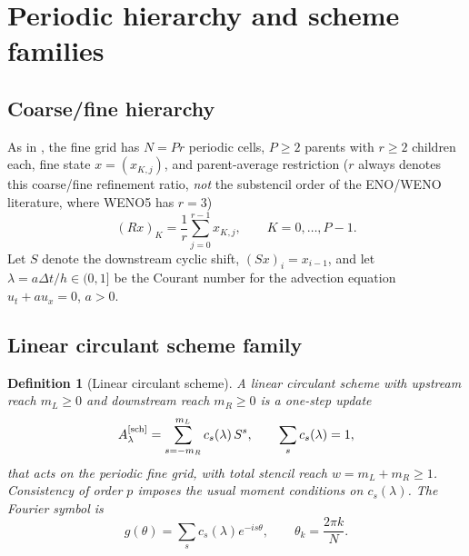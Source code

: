 \documentclass[pdflatex,sn-mathphys-num]{sn-jnl}%
\theoremstyle{thmstyleone}%
\theoremstyle{thmstyletwo}%
\theoremstyle{thmstylethree}%
\newtheorem{definition}{Definition}%
\newcommand{\Asch}{A^{[\rm sch]}_\lambda}
\begin{document}
\section{Periodic hierarchy and scheme families}\label{sec:setup}

\subsection{Coarse/fine hierarchy}\label{sec:hierarchy}

As in \cite{PolemitisChristakisDrikakis2026FVerasure}, the fine grid has $N=Pr$ periodic cells, $P\ge2$ parents with $r\ge2$ children each, fine state $x=(x_{K,j})$, and parent-average restriction ($r$ always denotes this coarse/fine refinement ratio, \emph{not} the substencil order of the ENO/WENO literature, where WENO5 has $r=3$) \[ (Rx)_K=\frac1r\sum_{j=0}^{r-1}x_{K,j}, \qquad K=0,\ldots,P-1 .\]
Let $S$ denote the downstream cyclic shift, $(Sx)_i=x_{i-1}$, and let $\lambda=a\Delta t/h\in(0,1]$ be the Courant number for the advection equation $u_t+au_x=0$, $a>0$.

\subsection{Linear circulant scheme family}\label{sec:linear-family}

\begin{definition}[Linear circulant scheme]\label{def:circulant-scheme}
A linear circulant scheme with upstream reach $m_L\ge0$ and downstream reach $m_R\ge0$ is a one-step update \[ \Asch = \sum_{s=-m_R}^{m_L} c_s(\lambda)\, S^{s}, \qquad \sum_s c_s(\lambda)=1 , \] that acts on the periodic fine grid, with total stencil reach $w=m_L+m_R\ge1$.
Consistency of order $p$ imposes the usual moment conditions on $c_s(\lambda)$.
The Fourier symbol is \[ g(\theta)=\sum_s c_s(\lambda)e^{-is\theta}, \qquad \theta_k=\frac{2\pi k}{N} .\]
\end{definition}
\end{document}
